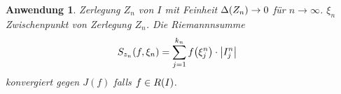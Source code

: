 \documentclass[11pt, twoside, a4paper]{article}
\theoremstyle{plain}
\newtheorem{anwendung}[blockelement]{Anwendung}
\newcommand{\of}[1]{\mathopen{}\mathclose{}\bgroup\left(#1\aftergroup\egroup\right)}
\newcommand{\abs}[1]{\left\lvert#1\right\rvert}
\newcommand{\fromto}{\rightarrow{}}
\newcommand{\ntoinf}[0]{n\fromto\infty}
\begin{document}
    \begin{anwendung}
        Zerlegung $Z_n$ von $I$ mit Feinheit $\Delta\of{Z_n}\fromto 0$ für $\ntoinf$. $\xi_n$ Zwischenpunkt von Zerlegung $Z_n$. Die Riemannnsumme
        \begin{align*}
            S_{z_n}\of{f, \xi_n} &= \sum_{j=1}^{k_n} f\of{\xi_j^n}\cdot\abs{I_j^n}
        \end{align*}
        konvergiert gegen $J(f)$ falls $f\in R\of{I}$.
    \end{anwendung}
\end{document}

